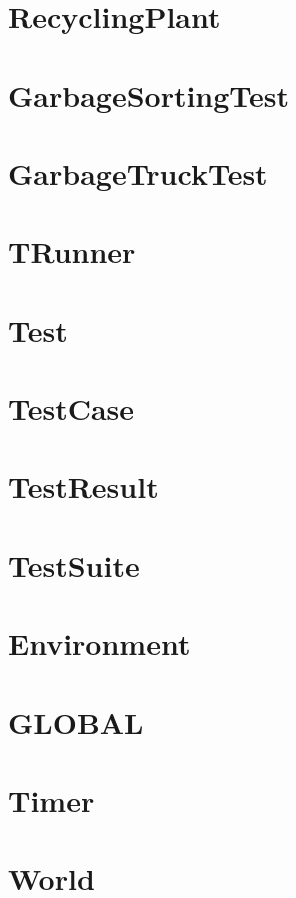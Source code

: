 \documentclass{article}
\begin{document}
\section{RecyclingPlant}

\section{GarbageSortingTest}

\section{GarbageTruckTest}

\section{TRunner}

\section{Test}

\section{TestCase}

\section{TestResult}

\section{TestSuite}

\section{Environment}

\section{GLOBAL}

\section{Timer}

\section{World}

\end{document}
